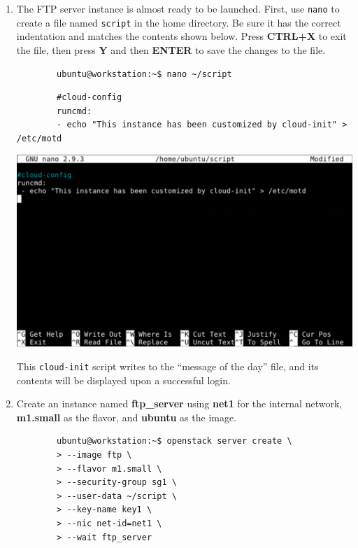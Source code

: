 \documentclass[letterpaper, 12pt]{article}
\begin{document}
\begin{enumerate}
    \item The FTP server instance is almost ready to be launched. First, use \texttt{nano} to create a file named
    \texttt{script} in the home directory. Be sure it has the correct indentation and matches the contents shown below.
    Press \textbf{CTRL+X} to exit the file, then press \textbf{Y} and then \textbf{ENTER} to save the changes to the
    file.
    \begin{lstlisting}
        ubuntu@workstation:~$ nano ~/script
    \end{lstlisting}
    \begin{lstlisting}
        #cloud-config
        runcmd:
        - echo "This instance has been customized by cloud-init" > /etc/motd
    \end{lstlisting}

    \begin{center}
        \includegraphics[width=\linewidth]{images/part1/step34.png}
    \end{center}

    \begin{notebox}
        This \texttt{cloud-init} script writes to the ``message of the day'' file, and its contents will be displayed
        upon a successful login.
    \end{notebox}

    \item Create an instance named \textbf{ftp\_server} using \textbf{net1} for the internal network, \textbf{m1.small}
    as the flavor, and \textbf{ubuntu} as the image.
    \begin{lstlisting}
        ubuntu@workstation:~$ openstack server create \
        > --image ftp \
        > --flavor m1.small \
        > --security-group sg1 \
        > --user-data ~/script \
        > --key-name key1 \
        > --nic net-id=net1 \
        > --wait ftp_server
    \end{lstlisting}


\end{enumerate}
\end{document}
